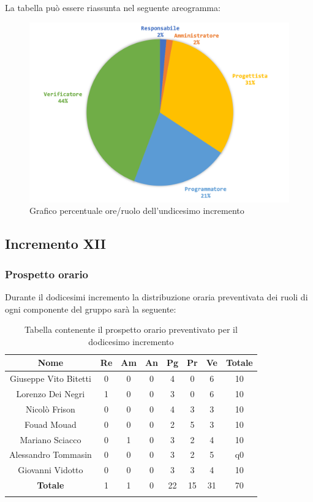 		La tabella può essere riassunta nel seguente areogramma:
		\begin{figure}[H]
			\centering
			\includegraphics[width=0.8\linewidth]{./images/preventivo/incremento11-2.png}
			\caption{Grafico percentuale ore/ruolo dell'undicesimo incremento}
			\label{fig:grafico costi ruolo incremento XI }
		\end{figure}
		
		
		
	\subsection{Incremento XII}
		\subsubsection{Prospetto orario}
		Durante il dodicesimi incremento la distribuzione oraria preventivata dei ruoli di ogni componente del gruppo sarà la seguente:
		
		\begin{longtable}{|c|c|c|c|c|c|c|c|}
			\hline
			\rowcolor{lighter-grayer}
			\textbf{Nome} & \textbf{Re} & \textbf{Am} & \textbf{An} & \textbf{Pg}  & \textbf{Pr}   & \textbf{Ve} & \textbf{Totale} \\
			\hline
			\endfirsthead
			
			\hline
			Giuseppe Vito Bitetti 		 & 0 & 0 & 0 & 4 & 0 & 6 & 10\\
			\hline
			\hline
			Lorenzo Dei Negri			 & 1 & 0 & 0 & 3 & 0 & 6 & 10\\
			\hline
			\hline
			Nicolò Frison				      & 0 & 0 & 0 & 4 & 3 & 3 & 10\\
			\hline
			\hline
			Fouad Mouad 				   & 0 & 0 & 0 & 2 & 5 & 3 & 10\\
			\hline
			\hline
			Mariano Sciacco 			 & 0 & 1 & 0 & 3 & 2 & 4 & 10\\
			\hline
			\hline
			Alessandro Tommasin    & 0 & 0 & 0 & 3 & 2 & 5 & q0\\
			\hline
			\hline
			Giovanni Vidotto 			  & 0 & 0 & 0 & 3 & 3 & 4 & 10\\
			\hline 
			\textbf{Totale}			 		& 1 & 1 & 0 & 22 & 15 & 31 & 70\\
			\hline
			\caption{Tabella contenente il prospetto orario preventivato per il dodicesimo incremento}
		\end{longtable}
		\pagebreak
		
